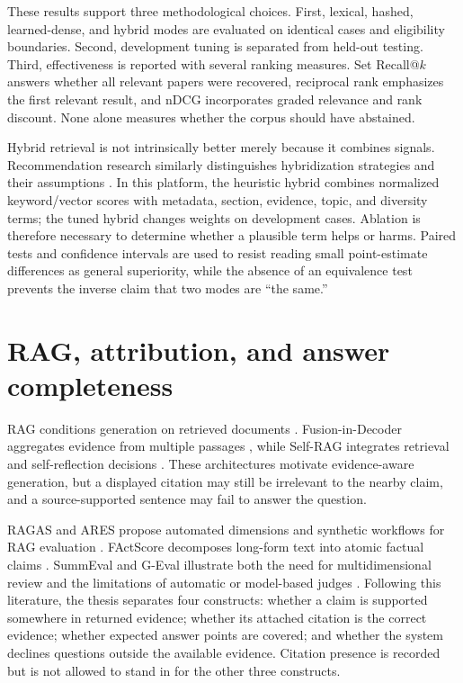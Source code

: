 These results support three methodological choices. First, lexical, hashed, learned-dense, and hybrid modes are evaluated on identical cases and eligibility boundaries. Second, development tuning is separated from held-out testing. Third, effectiveness is reported with several ranking measures. Set Recall@$k$ answers whether all relevant papers were recovered, reciprocal rank emphasizes the first relevant result, and nDCG incorporates graded relevance and rank discount. None alone measures whether the corpus should have abstained.

Hybrid retrieval is not intrinsically better merely because it combines signals. Recommendation research similarly distinguishes hybridization strategies and their assumptions \cite{burke2002hybrid}. In this platform, the heuristic hybrid combines normalized keyword/vector scores with metadata, section, evidence, topic, and diversity terms; the tuned hybrid changes weights on development cases. Ablation is therefore necessary to determine whether a plausible term helps or harms. Paired tests and confidence intervals are used to resist reading small point-estimate differences as general superiority, while the absence of an equivalence test prevents the inverse claim that two modes are ``the same.''

\section{RAG, attribution, and answer completeness}

RAG conditions generation on retrieved documents \cite{lewis2020rag}. Fusion-in-Decoder aggregates evidence from multiple passages \cite{izacard2021fid}, while Self-RAG integrates retrieval and self-reflection decisions \cite{asai2024selfrag}. These architectures motivate evidence-aware generation, but a displayed citation may still be irrelevant to the nearby claim, and a source-supported sentence may fail to answer the question.

RAGAS and ARES propose automated dimensions and synthetic workflows for RAG evaluation \cite{es2024ragas,saadfalcon2024ares}. FActScore decomposes long-form text into atomic factual claims \cite{min2023factscore}. SummEval and G-Eval illustrate both the need for multidimensional review and the limitations of automatic or model-based judges \cite{fabbri2021summeval,liu2023geval}. Following this literature, the thesis separates four constructs: whether a claim is supported somewhere in returned evidence; whether its attached citation is the correct evidence; whether expected answer points are covered; and whether the system declines questions outside the available evidence. Citation presence is recorded but is not allowed to stand in for the other three constructs.

